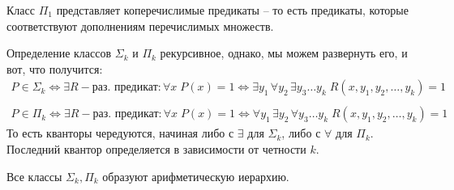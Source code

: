 Класс $\Pi_1$ представляет коперечислимые предикаты -- то есть предикаты, которые соответствуют дополнениям перечислимых множеств.

\vspace{3mm}

Определение классов $\Sigma_k$ и $\Pi_k$ рекурсивное, однако, мы можем развернуть его, и вот, что получится: \begin{gather*}
    P \in \Sigma_k \Longleftrightarrow \exists R - \text{раз. предикат} : \forall x \; P(x) = 1 \Leftrightarrow \exists y_1 \, \forall y_2 \, \exists y_3 \dots y_k \; R(x, y_1, y_2, \dots, y_k) = 1 \\ \\
    P \in \Pi_k \Longleftrightarrow \exists R - \text{раз. предикат} : \forall x \; P(x) = 1 \Leftrightarrow \forall y_1 \, \exists y_2 \, \forall y_3 \dots y_k \; R(x, y_1, y_2, \dots, y_k) = 1 
\end{gather*}
То есть кванторы чередуются, начиная либо с $\exists$ для $\Sigma_k$, либо с $\forall$ для $\Pi_k$. Последний квантор определяется в зависимости от четности $k$.

\begin{conj}
    Все классы $\Sigma_k, \Pi_k$ образуют арифметическую иерархию.
\end{conj}

